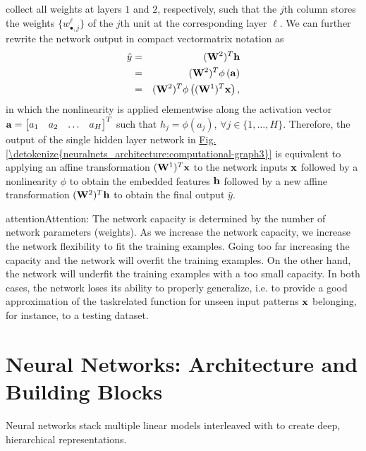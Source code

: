 \documentclass[letterpaper,10pt,english]{jupyterBook}
\begin{document}
\sphinxAtStartPar
collect all weights at layers \( 1 \) and \( 2 \), respectively, such that the \(j\)\sphinxhyphen{}th column stores the weights \( \lbrace w^{\ell}_{\bullet,j} \rbrace \) of the \(j\)\sphinxhyphen{}th unit at the corresponding layer \( \ell \). We can further rewrite the network output in compact vector\sphinxhyphen{}matrix notation as
\label{equation:neuralnets_architecture:067f614f-2bdb-4471-9f14-3e434aee03be}\begin{eqnarray}
\hat{y} &=& ({\bf W}^{2})^{T} {\bf h} \nonumber \\
&=& ({\bf W}^{2})^{T} \phi \left( {\bf a} \right) \nonumber \\
&=& ({\bf W}^{2})^{T} \phi \left( ({\bf W}^{1})^{T} {\bf x} \right), \nonumber
\end{eqnarray}
\sphinxAtStartPar
in which the non\sphinxhyphen{}linearity is applied element\sphinxhyphen{}wise along the activation vector \( {\bf a} = \begin{bmatrix} a_{1} & a_{2} & \ldots & a_{H} \end{bmatrix}^{T} \) such that \( h_{j} = \phi(a_{j}) \), \( \forall j \in \lbrace 1, \ldots, H \rbrace \). Therefore, the output of the single hidden layer network in \hyperref[\detokenize{neuralnets_architecture:computational-graph3}]{Fig.\@ \ref{\detokenize{neuralnets_architecture:computational-graph3}}} is equivalent to applying an affine transformation \( ({\bf W}^{1})^{T} {\bf x} \) to the network inputs \( {\bf x} \) followed by a non\sphinxhyphen{}linearity \( \phi \) to obtain the embedded features \( {\bf h} \) followed by a new affine transformation \( ({\bf W}^{2})^{T} {\bf h} \) to obtain the final output \( \hat{y} \).

\begin{sphinxadmonition}{attention}{Attention:}
\sphinxAtStartPar
The network capacity is determined by the number of network parameters (weights). As we increase the network capacity, we increase the network flexibility to fit the training examples. Going too far increasing the capacity and the network will overfit the training examples. On the other hand, the network will underfit the training examples with a too small capacity. In both cases, the network loses its ability to properly generalize, i.e. to provide a good approximation of the task\sphinxhyphen{}related function for unseen input patterns \( {\bf x} \) belonging, for instance, to a testing dataset.
\end{sphinxadmonition}


\section{Neural Networks: Architecture and Building Blocks}
\label{\detokenize{neuralnets_architecture:neural-networks-architecture-and-building-blocks}}
\sphinxAtStartPar
Neural networks stack multiple linear models interleaved with  to create deep, hierarchical representations.
\end{document}
